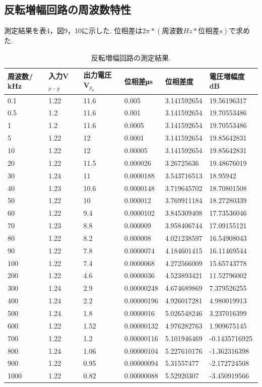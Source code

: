\documentclass[twocolumn, 10pt,a4j]{jsarticle}
\begin{document}
      \subsection{反転増幅回路の周波数特性}
          測定結果を表4，図9，10に示した. 位相差は$2\pi * (周波数Hz * 位相差s)$で求めた.

          \begin{table}[t]
            \centering
            \footnotesize
            \caption{反転増幅回路の測定結果.}
            \label{opeanpu_risouteki_tokusei}
            \begin{tabular}{llllll} \hline
周波数$f$kHz	& 入力V$_{p-p}$	& 出力電圧V$_{p_p}$	& 位相差μs	& 位相差度	& 電圧増幅度dB \\ \hline
0.1& 1.22& 11.6& 0.005& 3.141592654& 19.56196317 \\
0.5& 1.2& 11.6& 0.001& 3.141592654& 19.70553486 \\
1& 1.2& 11.6& 0.0005& 3.141592654& 19.70553486 \\
5& 1.22& 12& 0.0001& 3.141592654& 19.85642831 \\
10& 1.22& 12& 0.00005& 3.141592654& 19.85642831 \\
20& 1.22& 11.5& 0.000026& 3.26725636& 19.48676019 \\
30& 1.24& 11& 0.0000188& 3.543716513& 18.95942 \\
40& 1.23& 10.6& 0.0000148& 3.719645702& 18.70801508 \\
50& 1.22& 10& 0.000012& 3.769911184& 18.27280339 \\
60& 1.22& 9.4& 0.0000102& 3.845309408& 17.73536046 \\
70& 1.23& 8.8& 0.000009& 3.958406744& 17.09155121 \\
80& 1.22& 8.2& 0.000008& 4.021238597& 16.54908043 \\
90& 1.22& 7.8& 0.0000074& 4.184601415& 16.11469544 \\
100& 1.22& 7.4& 0.0000068& 4.272566009& 15.65743778 \\
200& 1.22& 4.6& 0.0000036& 4.523893421& 11.52796002 \\
300& 1.24& 2.9& 0.00000248& 4.674689869& 7.379526255 \\
400& 1.24& 2.2& 0.00000196& 4.926017281& 4.980019913 \\
500& 1.24& 1.8& 0.0000016& 5.026548246& 3.237016399 \\
600& 1.22& 1.52& 0.00000132& 4.976282763& 1.909675145 \\
700& 1.22& 1.2& 0.00000116& 5.101946469& -0.1435716925 \\
800& 1.24& 1.06& 0.00000104& 5.227610176& -1.362316398 \\
900& 1.22& 0.95& 0.00000094& 5.31557477& -2.172724508 \\
1000& 1.22& 0.82& 0.00000088& 5.52920307& -3.450919566 \\ \hline

            \end{tabular}
          \end{table}
\end{document}

